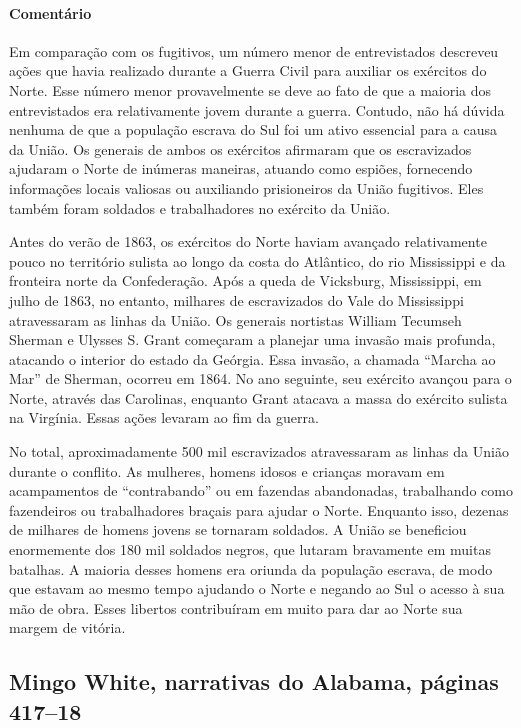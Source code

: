 \paragraph{Comentário}\quad
{\small
Em comparação com os fugitivos, um número menor de entrevistados
descreveu ações que havia realizado durante a Guerra Civil para auxiliar
os exércitos do Norte. Esse número menor provavelmente se deve ao fato
de que a maioria dos entrevistados era relativamente jovem durante a
guerra. Contudo, não há dúvida nenhuma de que a população escrava do Sul
foi um ativo essencial para a causa da União. Os generais de ambos os
exércitos afirmaram que os escravizados ajudaram o Norte de inúmeras
maneiras, atuando como espiões, fornecendo informações locais valiosas
ou auxiliando prisioneiros da União fugitivos. Eles também foram
soldados e trabalhadores no exército da União.

Antes do verão de 1863, os exércitos do Norte haviam avançado
relativamente pouco no território sulista ao longo da costa do
Atlântico, do rio Mississippi e da fronteira norte da Confederação. Após
a queda de Vicksburg, Mississippi, em julho de 1863, no entanto, 
milhares de escravizados do Vale do Mississippi atravessaram as linhas da 
União. Os generais nortistas William Tecumseh Sherman e Ulysses S. Grant
começaram a planejar uma invasão mais profunda, atacando o interior do
estado da Geórgia. Essa invasão, a chamada ``Marcha ao Mar'' de Sherman,
ocorreu em 1864. No ano seguinte, seu exército avançou para o Norte,
através das Carolinas, enquanto Grant atacava a massa do exército
sulista na Virgínia. Essas ações levaram ao fim da guerra.

No total, aproximadamente 500 mil escravizados atravessaram as linhas
da União durante o conflito. As mulheres, homens idosos e crianças
moravam em acampamentos de ``contrabando'' ou em fazendas abandonadas,
trabalhando como fazendeiros ou trabalhadores braçais para ajudar o
Norte. Enquanto isso, dezenas de milhares de homens jovens se tornaram
soldados. A União se beneficiou enormemente dos 180 mil soldados negros,
que lutaram bravamente em muitas batalhas. A maioria desses homens era
oriunda da população escrava, de modo que estavam ao mesmo tempo
ajudando o Norte e negando ao Sul o acesso à sua mão de obra. Esses
libertos contribuíram em muito para dar ao Norte sua margem de vitória.
}

\subsection{Mingo White, narrativas do Alabama, páginas 417--18}
\label{ref288}

